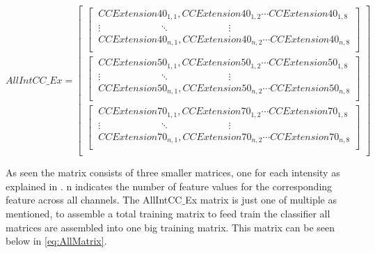 \begin{equation} \label{eq:CCMatrix}
AllIntCC\_Ex=\begin{bmatrix} 
\begin{bmatrix}
\ CCExtension40_{1,1}, CCExtension40_{1,2} \cdots CCExtension40_{1,8} \\ 
\ \vdots \qquad \qquad \qquad \ddots \qquad \qquad \qquad \vdots \\
\ CCExtension40_{n,1}, CCExtension40_{n,2}  \cdots CCExtension40_{n,8} \\ \end{bmatrix} \\
\begin{bmatrix} 
\ CCExtension50_{1,1}, CCExtension50_{1,2} \cdots CCExtension50_{1,8} \\
\ \vdots \qquad \qquad \qquad \ddots \qquad \qquad \qquad \vdots \\
\ CCExtension50_{n,1}, CCExtension50_{n,2} \cdots CCExtension50_{n,8} \\ \end{bmatrix} \\
\begin{bmatrix} 
\ CCExtension70_{1,1}, CCExtension70_{1,2} \cdots CCExtension70_{1,8} \\
\ \vdots \qquad \qquad \qquad \ddots \qquad \qquad \qquad \vdots \\
\ CCExtension70_{n,1}, CCExtension70_{n,2} \cdots CCExtension70_{n,8} \\ \end{bmatrix} \\
\end{bmatrix}
\end{equation}

As seen the matrix consists of three smaller matrices, one for each intensity as explained in . n indicates the number of feature values for the corresponding feature across all channels.  
The AllIntCC$\_$Ex matrix is just one of multiple as mentioned, to assemble a total training matrix to feed train the classifier all matrices are assembled into one big training matrix. This matrix can be seen below in \eqref{eq:AllMatrix}. 


